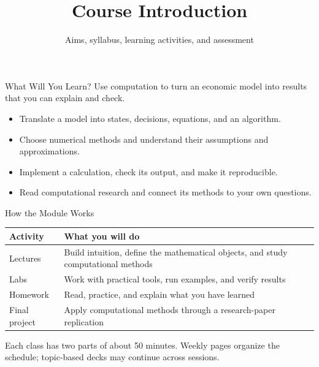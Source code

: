 \newcommand{\CourseTemplatePath}{../../../../../templates/slides/}

\title[Course Introduction]{Course Introduction}
\subtitle{Aims, syllabus, learning activities, and assessment}

\makecoursetitle

\begin{frame}{What Will You Learn?}
Use computation to turn an economic model into results that you can explain and check.
\medskip
\begin{itemize}
\item Translate a model into states, decisions, equations, and an algorithm.
\item Choose numerical methods and understand their assumptions and approximations.
\item Implement a calculation, check its output, and make it reproducible.
\item Read computational research and connect its methods to your own questions.
\end{itemize}
\end{frame}

\begin{frame}{How the Module Works}
\begin{tabularx}{\linewidth}{@{}lY@{}}
\toprule\textbf{Activity} & \textbf{What you will do}\\\midrule
Lectures & Build intuition, define the mathematical objects, and study computational methods\\
Labs & Work with practical tools, run examples, and verify results\\
Homework & Read, practice, and explain what you have learned\\
Final project & Apply computational methods through a research-paper replication\\\bottomrule
\end{tabularx}
\par\medskip
Each class has two parts of about 50 minutes. Weekly pages organize the schedule; topic-based decks may continue across sessions.
\end{frame}

